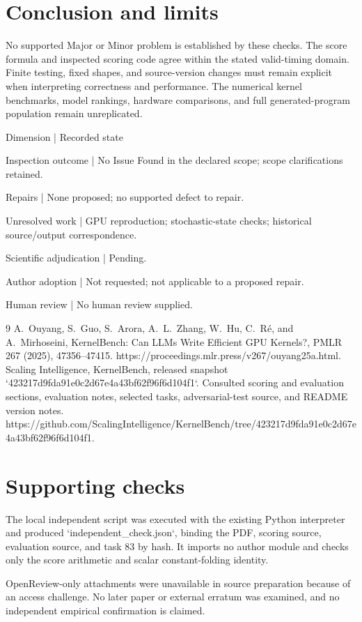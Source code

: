 \documentclass[10pt]{article}
\begin{document}
\section*{Conclusion and limits}
No supported Major or Minor problem is established by these checks. The score formula and inspected scoring code agree within the stated valid-timing domain. Finite testing, fixed shapes, and source-version changes must remain explicit when interpreting correctness and performance. The numerical kernel benchmarks, model rankings, hardware comparisons, and full generated-program population remain unreplicated.\par
Dimension | Recorded state\par
Inspection outcome | No Issue Found in the declared scope; scope clarifications retained.\par
Repairs | None proposed; no supported defect to repair.\par
Unresolved work | GPU reproduction; stochastic-state checks; historical source/output correspondence.\par
Scientific adjudication | Pending.\par
Author adoption | Not requested; not applicable to a proposed repair.\par
Human review | No human review supplied.\par
9 A. Ouyang, S. Guo, S. Arora, A. L. Zhang, W. Hu, C. Ré, and A. Mirhoseini, KernelBench: Can LLMs Write Efficient GPU Kernels?, PMLR 267 (2025), 47356–47415. https://proceedings.mlr.press/v267/ouyang25a.html. Scaling Intelligence, KernelBench, released snapshot `423217d9fda91e0c2d67e4a43bf62f96f6d104f1`. Consulted scoring and evaluation sections, evaluation notes, selected tasks, adversarial-test source, and README version notes. https://github.com/ScalingIntelligence/KernelBench/tree/423217d9fda91e0c2d67e4a43bf62f96f6d104f1.\par
\section*{Supporting checks}
The local independent script was executed with the existing Python interpreter and produced `independent\_check.json`, binding the PDF, scoring source, evaluation source, and task 83 by hash. It imports no author module and checks only the score arithmetic and scalar constant-folding identity.\par
OpenReview-only attachments were unavailable in source preparation because of an access challenge. No later paper or external erratum was examined, and no independent empirical confirmation is claimed.\par
\end{document}
